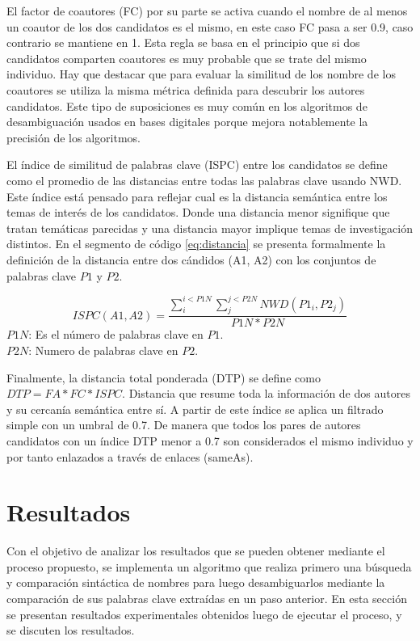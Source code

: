 \documentclass[conference]{IEEEtran}
\begin{document}
El factor de coautores (FC) por su parte se activa cuando el nombre de al menos un coautor de los dos candidatos es el mismo, en este caso FC pasa a ser 0.9, caso contrario se mantiene en 1. Esta regla se basa en el principio que si dos candidatos comparten coautores es muy probable que se trate del mismo individuo. Hay que destacar que para evaluar la similitud de los nombre de los coautores se utiliza la misma métrica definida para descubrir los autores candidatos. Este tipo de suposiciones es muy común en los algoritmos de desambiguación usados en bases digitales porque mejora notablemente la precisión de los algoritmos.

El índice de similitud de palabras clave (ISPC) entre los candidatos se define como el promedio de las distancias entre todas las palabras clave usando NWD. Este índice está pensado para reflejar cual es la distancia semántica entre los temas de interés de los candidatos. Donde una distancia menor signifique que tratan temáticas parecidas y una distancia mayor implique temas de investigación distintos. En el segmento de código \ref{eq:distancia} se presenta formalmente la definición de la distancia entre dos cándidos (A1, A2) con los conjuntos de  palabras clave $P1$ y $P2$.

\begin{equation}\label{eq:distancia}
ISPC(A1,A2) = \frac{\sum_i^{i<P1N}\sum_j^{j<P2N}NWD(P1_i, P2_j)}{P1N*P2N}
\end{equation}
$P1N$: Es el número de palabras clave en $P1$.\\
$P2N$: Numero de palabras clave en $P2$.

Finalmente, la distancia total ponderada (DTP) se define como $DTP= FA*FC*ISPC$. Distancia que resume toda la información de dos autores y su cercanía semántica entre sí. A partir de este índice se aplica un filtrado simple con un umbral de 0.7. De manera que todos los pares de autores candidatos con un índice DTP menor a 0.7 son considerados el mismo individuo y por tanto enlazados a través de enlaces (sameAs).

\section{Resultados}
Con el objetivo de analizar los resultados que se pueden obtener mediante el proceso propuesto, se implementa un algoritmo que realiza primero una búsqueda y comparación sintáctica de nombres para luego desambiguarlos mediante la comparación de sus palabras clave extraídas en un paso anterior. En esta sección se presentan resultados experimentales obtenidos luego de ejecutar el proceso, y se discuten los resultados.
\end{document}
